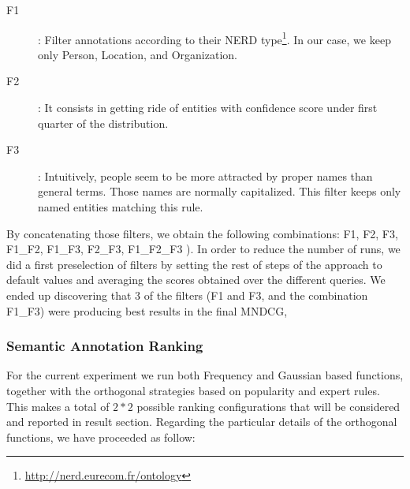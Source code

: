 \documentclass{llncs}
\begin{document}
\begin{description}
\item[F1]: Filter annotations according to their NERD type\footnote{\url{http://nerd.eurecom.fr/ontology}}. In our case, we keep only Person, Location, and Organization.
\item[F2]: It consists in getting ride of entities with confidence score under first quarter of the distribution.
\item[F3]: Intuitively, people seem to be more attracted by proper names than general terms. Those names are normally capitalized. This filter keeps only named entities matching this rule.
\end{description}

By concatenating those filters, we obtain the following combinations: F1,  F2,  F3,  F1\_F2,  F1\_F3, F2\_F3, F1\_F2\_F3 ). In order to reduce the number of runs, we did a first preselection of filters by setting the rest of steps of the approach to default values and averaging the scores obtained over the different queries. We ended up discovering that 3 of the filters (F1 and F3, and the combination F1\_F3) were producing best results in the final MNDCG, 

\subsubsection{Semantic Annotation Ranking}
\label{sec:settingsAnnotationRanking}
For the current experiment we run both Frequency and Gaussian based functions, together with the orthogonal strategies based on popularity and expert rules. This makes a total of $2*2$ possible ranking configurations that will be considered and reported in result section. Regarding the particular details of the orthogonal functions, we have proceeded as follow:
\end{document}
